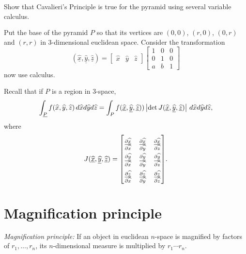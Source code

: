 \documentclass{ximera}
\begin{document}
\begin{problem}
Show that Cavalieri's Principle is true for the pyramid using several
variable calculus.

\begin{hint}
Put the base of the pyramid $P$ so that its vertices are $\left(
0,0\right) $, $\left( r,0\right) $, $\left( 0,r\right) $ and $\left(
r,r\right) $ in $3$-dimensional euclidean space. Consider the
transformation%
\[
\left(  \underline{\hat{x}},\underline{\hat{y}},\underline{\hat{z}}\right)
=
\begin{bmatrix}  \hat{x} & \hat{y} & \hat{z}\end{bmatrix}
\begin{bmatrix}
1 & 0 & 0\\
0 & 1 & 0\\
a & b & 1
\end{bmatrix}
\]
now use calculus.
\end{hint}

\begin{hint}
Recall that if $P$ is a region in $3$-space, 
\[
\int_{\underline{P}} f(\widehat{x},\widehat{y},\widehat{z})  \,d \widehat{x}d\widehat{y}d\widehat{z} = 
\int_{P} f(\underline{\widehat{x}},\underline{\widehat{y}},\underline{\widehat{z}})) \left|\det J(\underline{\widehat{x}},\underline{\widehat{y}},\underline{\widehat{z}})\right| \,d \widehat{x}d\widehat{y}d\widehat{z},
\]
where
\[
J(\underline{\hat{x}},\underline{\hat{y}},\underline{\hat{z}}) =
{\renewcommand\arraystretch{2}
\begin{bmatrix}
\pp[\underline{\hat{x}}]{\hat{x}} & \pp[\underline{\hat{x}}]{\hat{y}} & \pp[\underline{\hat{x}}]{\hat{z}} \\
\pp[\underline{\hat{y}}]{\hat{x}} & \pp[\underline{\hat{y}}]{\hat{y}} & \pp[\underline{\hat{y}}]{\hat{z}} \\
\pp[\underline{\hat{z}}]{\hat{x}} & \pp[\underline{\hat{z}}]{\hat{y}} & \pp[\underline{\hat{z}}]{\hat{z}} 
\end{bmatrix}}.
\]
\end{hint}



\end{problem}

\section{Magnification principle}

\textit{Magnification principle:} If an object in euclidean $n$-space is
magnified by factors of $r_{1},\ldots,r_{n}$, its $n$-dimensional
measure is multiplied by $r_{1}\cdots r_{n}$.
\end{document}
